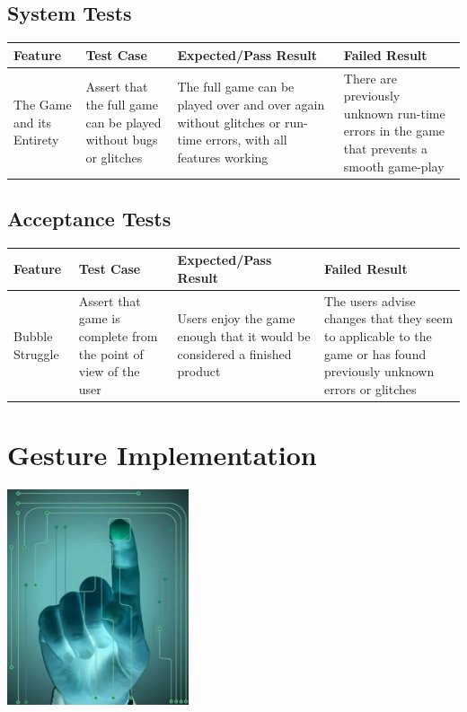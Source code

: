 \documentclass{article}
\begin{document}
\subsection{System Tests}
\begin{center}
\begin{tabular}{ | m{5em} | m{4cm}| m{4cm} |  m{4cm} |} 
      \hline
      Feature & Test Case & Expected/Pass Result & Failed Result \\ 
      \hline
      The Game and its Entirety & Assert that the full game can be played without bugs or glitches & The full game can be played over and over again without glitches or run-time errors, with all features working & There are previously unknown run-time errors in the game that prevents a smooth game-play \\ 
      \hline
\end{tabular}
\end{center}

\clearpage

\subsection{Acceptance Tests}
\begin{center}
\begin{tabular}{ | m{5em} | m{4cm}| m{4cm} |  m{4cm} |} 
      \hline
      Feature & Test Case & Expected/Pass Result & Failed Result \\ 
      \hline
      Bubble Struggle & Assert that game is complete from the point of view of the user & Users enjoy the game enough that it would be considered a finished product & The users advise changes that they seem to applicable to the game or has found previously unknown errors or glitches \\ 
      \hline
\end{tabular}
\end{center}

\bigskip

\section{Gesture Implementation}
\includegraphics[width=\textwidth, height=180pt]{img/GestureImplementation.PNG}
\end{document}
